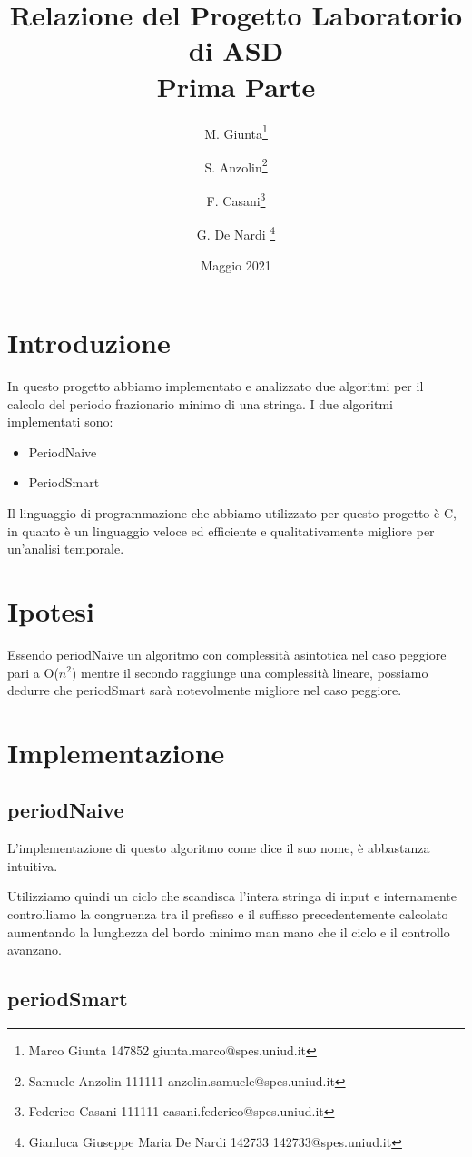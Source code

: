 \documentclass[a4paper,titlepage]{article}
\title{Relazione del Progetto Laboratorio di ASD\\[0.5em]
\large Prima Parte}
\date{Maggio 2021}
\author{
M. Giunta\thanks{Marco Giunta 147852 giunta.marco@spes.uniud.it} \and
S. Anzolin\thanks{Samuele Anzolin 111111 anzolin.samuele@spes.uniud.it} \and
F. Casani\thanks{Federico Casani 111111 casani.federico@spes.uniud.it} \and
G. De Nardi \thanks{Gianluca Giuseppe Maria De Nardi 142733 142733@spes.uniud.it}
}
\begin{document}
\maketitle

\tableofcontents
\newpage

\section{Introduzione}
In questo progetto abbiamo implementato e analizzato due algoritmi per il calcolo del periodo frazionario minimo di una stringa.
I due algoritmi implementati sono:

\begin{itemize}
  \item PeriodNaive
  \item PeriodSmart
\end{itemize}

Il linguaggio di programmazione che abbiamo utilizzato per questo progetto è C, in quanto è un linguaggio veloce ed efficiente e qualitativamente migliore per un’analisi temporale.

\section{Ipotesi}
Essendo periodNaive un algoritmo con complessità asintotica nel caso peggiore pari a O(\(n^2\)) mentre il secondo raggiunge una complessità lineare, possiamo dedurre
che periodSmart sarà notevolmente migliore nel caso peggiore.

\section{Implementazione}

\subsection{periodNaive}

L’implementazione di questo algoritmo come dice il suo nome, è abbastanza intuitiva.

Utilizziamo quindi un ciclo che scandisca l’intera stringa di input e internamente controlliamo la congruenza tra il prefisso e il suffisso precedentemente calcolato aumentando la lunghezza del bordo minimo man mano che il ciclo e il controllo avanzano.

\subsection{periodSmart}
\end{document}
